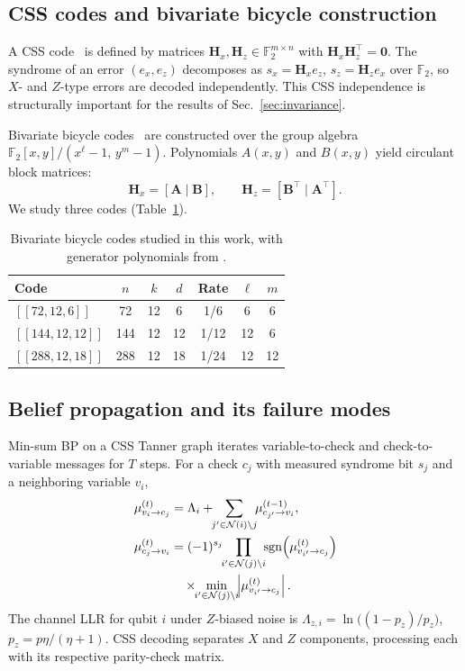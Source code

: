 \documentclass[a4paper,twocolumn,11pt,nopdfoutputerror]{quantumarticle}
\newcommand{\F}{\mathbb{F}}
\newcommand{\llr}{\Lambda}
\newcommand{\Hmat}{\mathbf{H}}
\newcommand{\code}[3]{\ensuremath{[\![#1,#2,#3]\!]}}
\begin{document}
\subsection{CSS codes and bivariate bicycle construction}

A CSS code~\cite{Calderbank1996Good,Steane1996Error} is defined by
matrices $\Hmat_x, \Hmat_z \in \F_2^{m \times n}$ with
$\Hmat_x \Hmat_z^\top = \mathbf{0}$. The syndrome of an error
$(e_x, e_z)$ decomposes as
$s_x = \Hmat_x e_z$,
$s_z = \Hmat_z e_x$
over $\F_2$, so $X$- and $Z$-type errors are decoded independently.
This CSS independence is structurally important for the results
of Sec.~\ref{sec:invariance}.

Bivariate bicycle codes~\cite{Bravyi2024Memory} are constructed
over the group algebra $\F_2[x,y]/(x^\ell-1,\,y^m-1)$. Polynomials
$A(x,y)$ and $B(x,y)$ yield circulant block matrices:
\begin{equation}
\Hmat_x = [\mathbf{A} \mid \mathbf{B}], \qquad
\Hmat_z = [\mathbf{B}^\top \mid \mathbf{A}^\top].
\label{eq:bb}
\end{equation}
We study three codes (Table~\ref{tab:codes}).

\begin{table}[t]
\centering
\small
\caption{Bivariate bicycle codes studied in this work, with
         generator polynomials from \cite{Bravyi2024Memory}.}
\label{tab:codes}
\begin{tabular}{@{}lcccccc@{}}
\toprule
Code & $n$ & $k$ & $d$ & Rate & $\ell$ & $m$ \\
\midrule
$\code{72}{12}{6}$   &  72 & 12 &  6 & 1/6  &  6 &  6 \\
$\code{144}{12}{12}$ & 144 & 12 & 12 & 1/12 & 12 &  6 \\
$\code{288}{12}{18}$ & 288 & 12 & 18 & 1/24 & 12 & 12 \\
\bottomrule
\end{tabular}
\end{table}

\subsection{Belief propagation and its failure modes}\label{sec:bp}

Min-sum BP on a CSS Tanner graph iterates variable-to-check and
check-to-variable messages for $T$ steps. For a check $c_j$ with measured
syndrome bit $s_j$ and a neighboring variable $v_i$,
\begin{align}
\mu_{v_i \to c_j}^{(t)}
&= \llr_i + \!\!\sum_{j' \in \mathcal{N}(i)\setminus j}\!\!
\mu_{c_{j'} \to v_i}^{(t-1)},
\label{eq:vtc}\\
\mu_{c_j \to v_i}^{(t)}
&= (-1)^{s_j}
\!\!\prod_{i' \in \mathcal{N}(j)\setminus i}\!\!
\mathrm{sgn}\!\left(\mu_{v_{i'}\to c_j}^{(t)}\right) \notag\\
&\quad \times
\!\!\min_{i'\in\mathcal{N}(j)\setminus i}\!\!
\left|\mu_{v_{i'}\to c_j}^{(t)}\right|.
\label{eq:ctv}
\end{align}
The channel LLR for qubit $i$ under $Z$-biased noise is
$\llr_{z,i} = \ln\bigl((1-p_z)/p_z\bigr)$,
$p_z = p\eta/(\eta+1)$.
CSS decoding separates $X$ and $Z$ components, processing each with
its respective parity-check matrix.
\end{document}
